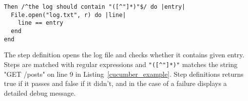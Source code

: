 \begin{lstlisting}[label=step_definition_example,caption=Cucumber step definition.]
Then /^the log should contain "([^"]*)"$/ do |entry|
  File.open("log.txt", r) do |line|
    line == entry
  end 
end
\end{lstlisting}

The step definition opens the log file and checks whether it contains given
entry. Steps are matched with regular expressions and \texttt{"([^"]*)"}
matches the string "GET /posts" on line 9 in Listing~\ref{cucumber_example}.
Step definitions returns true if it passes and false if it didn't, and in the
case of a failure displays a detailed debug message.


